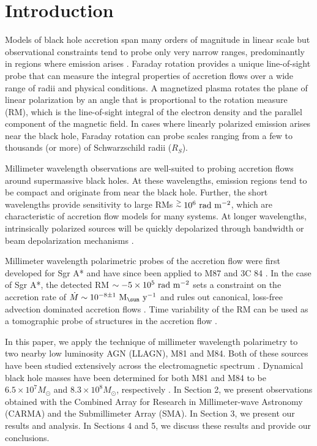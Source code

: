 \documentclass[12pt,preprint]{aastex}
\begin{document}


\section{Introduction}

Models of black hole accretion span many orders of magnitude in linear scale but
observational constraints tend to probe only very narrow ranges, predominantly 
in regions where emission arises \citep{2014ARA&A..52..529Y}.  Faraday rotation provides a unique line-of-sight
probe that can measure the integral properties of accretion flows over a wide
range of radii and physical conditions.  A magnetized plasma rotates the plane of linear polarization by an angle that
is proportional to the rotation measure (RM), which is the 
line-of-sight integral of the electron density and the
parallel component of the magnetic field.  In cases where linearly polarized emission arises
near the black hole, Faraday rotation can probe scales ranging from a few to thousands
(or more) of Schwarzschild radii ($R_S$).

Millimeter wavelength observations are well-suited to probing accretion flows
around supermassive black holes.  At these
wavelengths, emission regions tend to be compact and originate from near the
black hole.  Further, the short wavelengths provide sensitivity to large RMs $\stackrel{\scriptstyle >}{\scriptstyle \sim} 10^6 {\rm\ rad\ m^{-2}}$,
which are characteristic of accretion flow models for many systems.  At longer wavelengths,
intrinsically polarized sources will be quickly depolarized through bandwidth or beam
depolarization mechanisms \citep[e.g.,][]{1999ApJ...521..582B}.

Millimeter wavelength polarimetric probes of the accretion flow were first developed for Sgr A* \citep{2003ApJ...588..331B,2007ApJ...654L..57M} and
have since been applied to M87 \citep{2014ApJ...783L..33K} and 3C 84 \citep{2014ApJ...797...66P}.  In the case
of Sgr A*, the detected RM $\sim -5 \times 10^5 {\rm\ rad\ m^{-2}}$ sets a constraint on the accretion
rate of $\dot{M} \sim 10^{-8 \pm 1} \msuny$ and rules out canonical, loss-free
advection dominated accretion flows \citep[ADAFs;][]{1995ApJ...452..710N}.  Time
variability of the RM can be used as a tomographic probe of structures in the accretion flow
\citep{2005ApJ...618L..29B,2011MNRAS.415.1228P}.

In this paper, we apply the technique of millimeter wavelength polarimetry to two
nearby low luminosity AGN (LLAGN), M81 and M84.  Both of these sources
have been studied extensively across the electromagnetic spectrum 
\citep[e.g.,][]{2000ApJ...532..895B,2004AJ....127..119L,2008ApJ...681..905M,2015ApJ...811L...6B,2013MNRAS.432..530R}.
Dynamical black hole masses have been determined for both M81 and M84 to be
$6.5 \times 10^7 M_\odot$ and
$8.3 \times 10^8 M_\odot$, respectively 
\citep{2013ARAA..51..511K}.
In Section 2, we present observations obtained with the Combined Array for Research in Millimeter-wave Astronomy (CARMA) and the Submillimeter Array (SMA).
In Section 3, we present our results and analysis.  In Sections 4 and 5, we discuss
these results and provide our conclusions.
\end{document}
